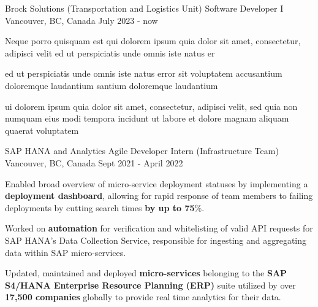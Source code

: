 
\begin{cventries}
 \cventry
    {Brock Solutions (Transportation and Logistics Unit)} %
    {Software Developer I} %
    {Vancouver, BC, Canada} %
    {July 2023 - now} %
{
      \begin{cvitems} %
      \item {Neque porro quisquam est qui dolorem ipsum quia dolor sit amet, consectetur, adipisci velit ed ut perspiciatis unde omnis iste natus er}
      \item {ed ut perspiciatis unde omnis iste natus error sit voluptatem accusantium doloremque laudantium santium doloremque laudantium}
       \item {ui dolorem ipsum quia dolor sit amet, consectetur, adipisci velit, sed quia non numquam eius modi tempora incidunt ut labore et dolore magnam aliquam quaerat voluptatem}
      \end{cvitems}
    }      
 \cventry
    {SAP HANA and Analytics} %
    {Agile Developer Intern (Infrastructure Team)} %
    {Vancouver, BC, Canada} %
    {Sept 2021 - April 2022} %
    {
      \begin{cvitems} %
      \item {Enabled broad overview of micro-service deployment statuses by implementing a \textbf{deployment dashboard}, allowing for rapid response of team members to failing deployments by cutting search times\textbf{ by up to 75}\%.}
      \item {Worked on \textbf{automation} for verification and whitelisting of valid API requests for SAP HANA's Data Collection Service, responsible for ingesting and aggregating data within SAP micro-services.}
       \item {Updated, maintained and deployed \textbf{micro-services} belonging to the \textbf{SAP S4/HANA Enterprise Resource Planning (ERP)} suite utilized by over \textbf{17,500 companies} globally to provide real time analytics for their data.}

\end{cvitems}}
\end{cventries}
